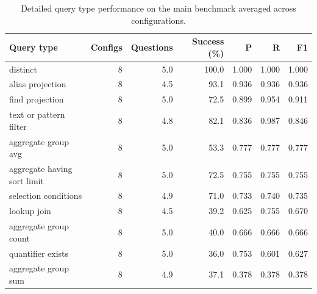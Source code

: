 ﻿\begin{table}[htbp]
\centering
\small
\caption{Detailed query type performance on the main benchmark averaged across configurations.}
\label{tab:query-type-performance}
\begin{tabular}{lrrrrrr}
\toprule
Query type & Configs & Questions & Success (\%) & P & R & F1 \\
\midrule
distinct & 8 & 5.0 & 100.0 & 1.000 & 1.000 & 1.000 \\
alias projection & 8 & 4.5 & 93.1 & 0.936 & 0.936 & 0.936 \\
find projection & 8 & 5.0 & 72.5 & 0.899 & 0.954 & 0.911 \\
text or pattern filter & 8 & 4.8 & 82.1 & 0.836 & 0.987 & 0.846 \\
aggregate group avg & 8 & 5.0 & 53.3 & 0.777 & 0.777 & 0.777 \\
aggregate having sort limit & 8 & 5.0 & 72.5 & 0.755 & 0.755 & 0.755 \\
selection conditions & 8 & 4.9 & 71.0 & 0.733 & 0.740 & 0.735 \\
lookup join & 8 & 4.5 & 39.2 & 0.625 & 0.755 & 0.670 \\
aggregate group count & 8 & 5.0 & 40.0 & 0.666 & 0.666 & 0.666 \\
quantifier exists & 8 & 5.0 & 36.0 & 0.753 & 0.601 & 0.627 \\
aggregate group sum & 8 & 4.9 & 37.1 & 0.378 & 0.378 & 0.378 \\
\bottomrule
\end{tabular}
\end{table}

